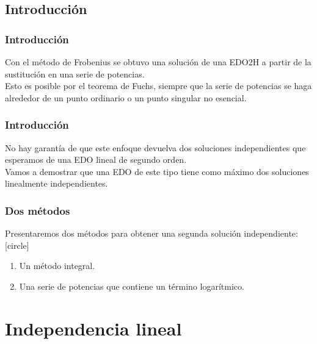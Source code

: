 \subsection{Introducción}
\begin{frame}
\frametitle{Introducción}
Con el método de Frobenius se obtuvo una solución de una EDO2H a partir de la sustitución en una serie de potencias.
\\
\bigskip
Esto es posible por el teorema de Fuchs, siempre que la serie de potencias se haga alrededor de un punto ordinario o un punto singular no esencial.
\end{frame}
\begin{frame}
\frametitle{Introducción}
No hay garantía de que este enfoque devuelva dos soluciones independientes que esperamos de una EDO lineal de segundo orden.
\\
\bigskip
Vamos a demostrar que una EDO de este tipo tiene como máximo dos soluciones linealmente independientes. 
\end{frame}
\begin{frame}
\frametitle{Dos métodos }
Presentaremos dos métodos para obtener una segunda solución independiente:
[circle]
\begin{enumerate}[<+->]
\item Un método integral.
\item Una serie de potencias que contiene un término logarítmico.
\end{enumerate}
\end{frame}
\section{Independencia lineal}
